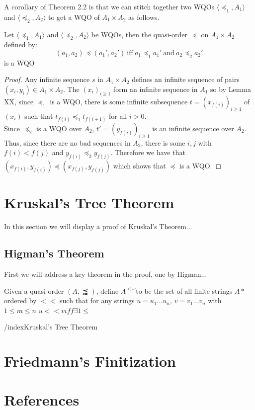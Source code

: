 \documentclass[a4paper]{article}
\begin{document}
A corollary of Theorem 2.2 is that we can stitch together two WQOs $\langle\preccurlyeq_1, A_1\rangle$ and $\langle\preccurlyeq_2, A_2\rangle$ to get a WQO of $A_1 \times A_2$ as follows.
\begin{lemma}
Let $\langle\preccurlyeq_1, A_1\rangle$ and $\langle\preccurlyeq_2, A_2\rangle$ be WQOs, then the quasi-order $\preccurlyeq$ on $A_1 \times A_2$ defined by:
\begin{equation*}
(a_1,a_2) \preccurlyeq (a_1',a_2') \ \text{iff}  \ a_1 \preccurlyeq_1 a_1' \ \text{and} \ a_2 \preccurlyeq_2 a_2'
\end{equation*}
 is a WQO
\end{lemma}
\begin{proof}
Any infinite sequence $s$ in $A_1 \times A_2$ defines an infinite sequence of pairs $(x_i,y_i) \in A_1 \times A_2$. The $(x_i)_{i \geq 1}$ form an infinite sequence in $A_1$ so by Lemma XX, since $\preccurlyeq_1$ is a WQO, there is some infinite subsequence $t = (x_{f(i)})_{i \geq 1}$ of $(x_i)$ such that $t_{f(i)} \preccurlyeq_1 t_{f(i+1)}$ for all $ i > 0$.\\
Since $\preccurlyeq_2$ is a WQO over $A_2$, $t' = (y_{f(i)})_{i \geq 1}$ is an infinite sequence over $A_2$. Thus, since there are no bad sequences in $A_2$, there is some $i , j$ with $f(i) < f(j)$ and $y_{f(i)} \preccurlyeq_2 y_{f(j)}$. Therefore we have that $(x_{f(i)}, y_{f(i)}) \preccurlyeq (x_{f(j)}, y_{f(j)})$ which shows that $\preccurlyeq$ is a WQO.
\end{proof}
\section{Kruskal's Tree Theorem}
In this section we will display a proof of Kruskal's Theorem...

\subsection{Higman's Theorem}
First we will address a key theorem in the proof, one by Higman...
\begin{definition}[$A^{<\omega}$]
	Given a quasi-order $(A, \precapprox)$, define $A^{<\omega}$to be the set of all finite strings $A*$ ordered by $<<$ such that for any strings $u = u_1...u_n$, $v = v_1...v_n$ with $1 \leq m \leq n$
	\(u << v iff \exists 1 \leq \)
\end{definition}

\begin{theorem}/index{Kruskal's Tree Theorem}
	
\end{theorem}
\section{Friedmann's Finitization}
\section{References}







\printindex
\end{document}
